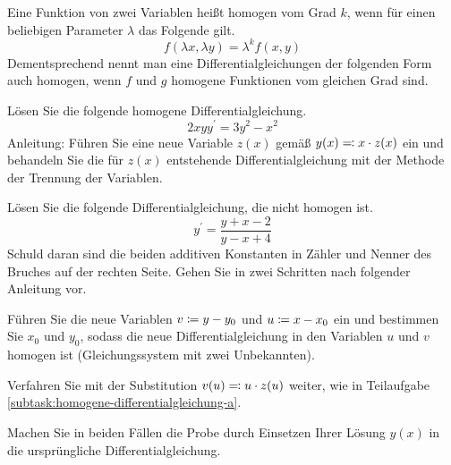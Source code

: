\begin{atiTask}[
	title = Homogene Differentialgleichungen,
	points = 13
]
	Eine Funktion von zwei Variablen heißt homogen vom Grad $k$, wenn für einen beliebigen Parameter $\lambda$ das Folgende gilt.
	\[
		f(\lambda x, \lambda y) = \lambda^k f(x,y)
	\]
	Dementsprechend nennt man eine Differentialgleichungen der folgenden Form auch homogen, wenn $f$ und $g$ homogene Funktionen vom gleichen Grad sind.

	\begin{atiSubtasks}
		\item \label{subtask:homogene-differentialgleichung-a}
		Lösen Sie die folgende homogene Differentialgleichung.
		\[
			2xyy^\prime = 3y^2 - x^2
		\]
		Anleitung: Führen Sie eine neue Variable $z(x)$ gemäß $y(x)\eqqcolon x\cdot z(x)$ ein und behandeln Sie die für $z(x)$ entstehende Differentialgleichung mit der Methode der Trennung der Variablen.

		\item
		Lösen Sie die folgende Differentialgleichung, die nicht homogen ist.
		\[
			y^\prime = \frac{y+x-2}{y-x+4}
		\]
		Schuld daran sind die beiden additiven Konstanten in Zähler und Nenner des Bruches auf der rechten Seite.
		Gehen Sie in zwei Schritten nach folgender Anleitung vor.
		\begin{atiItems}
			\item Führen Sie die neue Variablen $v\coloneqq y-y_0$ und $u\coloneqq x-x_0$ ein und bestimmen Sie $x_0$ und $y_0$, sodass die neue Differentialgleichung in den Variablen $u$ und $v$ homogen ist (Gleichungssystem mit zwei Unbekannten).

			\item Verfahren Sie mit der Substitution $v(u)\eqqcolon u\cdot z(u)$ weiter, wie in Teilaufgabe \ref{subtask:homogene-differentialgleichung-a}.
		\end{atiItems}

		\item
		Machen Sie in beiden Fällen die Probe durch Einsetzen Ihrer Lösung $y(x)$ in die ursprüngliche Differentialgleichung.
	\end{atiSubtasks}
\end{atiTask}

